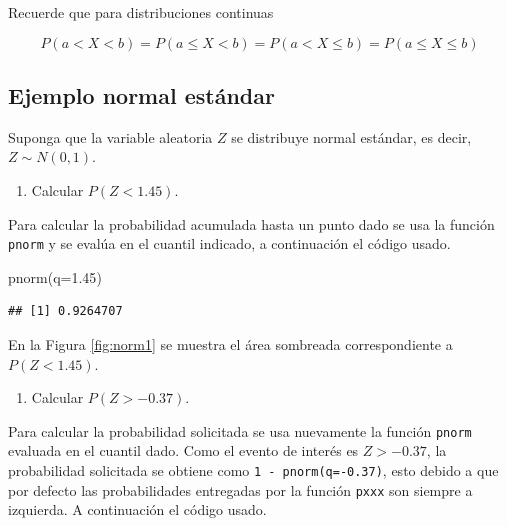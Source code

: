 \documentclass[
]{book}
\makeatletter
\newenvironment{Shaded}{\begin{snugshade}}{\end{snugshade}}
\newcommand{\AttributeTok}[1]{\textcolor[rgb]{0.77,0.63,0.00}{#1}}
\newcommand{\FloatTok}[1]{\textcolor[rgb]{0.00,0.00,0.81}{#1}}
\newcommand{\FunctionTok}[1]{\textcolor[rgb]{0.00,0.00,0.00}{#1}}
\newcommand{\NormalTok}[1]{#1}
\providecommand{\tightlist}{%
  \setlength{\itemsep}{0pt}\setlength{\parskip}{0pt}}
\newenvironment{kframe}{%
\medskip{}
\setlength{\fboxsep}{.8em}
 \def\at@end@of@kframe{}%
 \ifinner\ifhmode%
  \def\at@end@of@kframe{\end{minipage}}%
  \begin{minipage}{\columnwidth}%
 \fi\fi%
 \def\FrameCommand##1{\hskip\@totalleftmargin \hskip-\fboxsep
 \colorbox{shadecolor}{##1}\hskip-\fboxsep
     \hskip-\linewidth \hskip-\@totalleftmargin \hskip\columnwidth}%
 \MakeFramed {\advance\hsize-\width
   \@totalleftmargin\z@ \linewidth\hsize
   \@setminipage}}%
 {\par\unskip\endMakeFramed%
 \at@end@of@kframe}
\renewenvironment{Shaded}{\begin{kframe}}{\end{kframe}}
\newenvironment{rmdblock}[1]
  {
  \begin{itemize}
  \renewcommand{\labelitemi}{
    \raisebox{-.7\height}[0pt][0pt]{
      {\setkeys{Gin}{width=3em,keepaspectratio}\texttt{[image: images/\#1]}}
    }
  }
  \setlength{\fboxsep}{1em}
  \begin{kframe}
  \item
  }
  {
  \end{kframe}
  \end{itemize}
  }
\newenvironment{rmdnote}
  {\begin{rmdblock}{note}}
  {\end{rmdblock}}
\makeatother
\begin{document}
\begin{rmdnote}
Recuerde que para distribuciones continuas

\[ P(a < X < b) = P(a \leq X < b) = P(a < X \leq b) = P(a \leq X \leq b)\]
\end{rmdnote}

\hypertarget{ejemplo-normal-estuxe1ndar}{%
\subsection*{Ejemplo normal estándar}\label{ejemplo-normal-estuxe1ndar}}

Suponga que la variable aleatoria \(Z\) se distribuye normal estándar, es decir, \(Z \sim N(0, 1)\).

\begin{enumerate}
\def\labelenumi{\arabic{enumi})}
\tightlist
\item
  Calcular \(P(Z < 1.45)\).
\end{enumerate}

Para calcular la probabilidad acumulada hasta un punto dado se usa la función \texttt{pnorm} y se evalúa en el cuantil indicado, a continuación el código usado.

\begin{Shaded}
\begin{Highlighting}[]
\FunctionTok{pnorm}\NormalTok{(}\AttributeTok{q=}\FloatTok{1.45}\NormalTok{)}
\end{Highlighting}
\end{Shaded}

\begin{verbatim}
## [1] 0.9264707
\end{verbatim}

En la Figura \ref{fig:norm1} se muestra el área sombreada correspondiente a \(P(Z < 1.45)\).

\begin{enumerate}
\def\labelenumi{\arabic{enumi})}
\setcounter{enumi}{1}
\tightlist
\item
  Calcular \(P(Z > -0.37)\).
\end{enumerate}

Para calcular la probabilidad solicitada se usa nuevamente la función \texttt{pnorm} evaluada en el cuantil dado. Como el evento de interés es \(Z > -0.37\), la probabilidad solicitada se obtiene como \texttt{1\ -\ pnorm(q=-0.37)}, esto debido a que por defecto las probabilidades entregadas por la función \texttt{pxxx} son siempre a izquierda. A continuación el código usado.
\end{document}
